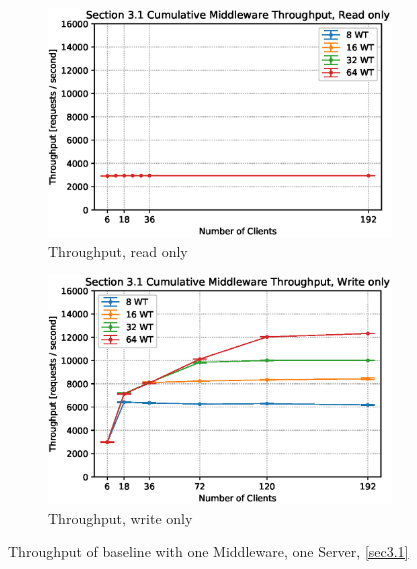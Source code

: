 \documentclass[11pt,a4paper]{article}
\begin{document}
\begin{figure}
    \begin{subfigure}{.5\textwidth}
        \includegraphics[width=1\linewidth]{plots/3_1a_throughputMiddleware.eps}
        \caption{Throughput, read only}
    \end{subfigure}
    \begin{subfigure}{.5\textwidth}
        \includegraphics[width=1\linewidth]{plots/3_1b_throughputMiddleware.eps}
        \caption{Throughput, write only}
    \end{subfigure}
    \caption{Throughput of baseline with one Middleware, one Server, \autoref{sec3.1}}
    \label{fig:3-1-throughput}
\end{figure}
\end{document}
